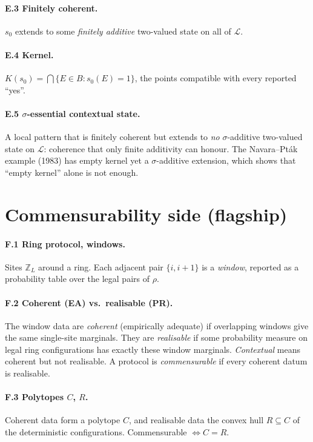 \documentclass[11pt]{article}
\theoremstyle{definition}
\theoremstyle{remark}
\newcommand{\bbZ}{\mathbb{Z}}
\begin{document}
\paragraph{E.3 Finitely coherent.} $s_0$ extends to some \emph{finitely
additive} two-valued state on all of $\mathcal L$.

\paragraph{E.4 Kernel.} $K(s_0)=\bigcap\{E\in B: s_0(E)=1\}$, the points
compatible with every reported ``yes''.

\paragraph{E.5 $\sigma$-essential contextual state.} A local pattern that is
finitely coherent but extends to \emph{no} $\sigma$-additive two-valued state on
$\mathcal L$: coherence that only finite additivity can honour. The
Navara--Pt\'ak example (1983) has empty kernel yet a $\sigma$-additive extension,
which shows that ``empty kernel'' alone is not enough.

\section{Commensurability side (flagship)}

\paragraph{F.1 Ring protocol, windows.} Sites $\bbZ_L$ around a ring. Each
adjacent pair $\{i,i+1\}$ is a \emph{window}, reported as a probability table over
the legal pairs of $\rho$.

\paragraph{F.2 Coherent (EA) vs.\ realisable (PR).} The window data are
\emph{coherent} (empirically adequate) if overlapping windows give the same
single-site marginals. They are \emph{realisable} if some probability measure on
legal ring configurations has exactly these window marginals. \emph{Contextual}
means coherent but not realisable. A protocol is \emph{commensurable} if every
coherent datum is realisable.

\paragraph{F.3 Polytopes $C$, $R$.} Coherent data form a polytope $C$, and
realisable data the convex hull $R\subseteq C$ of the deterministic
configurations. Commensurable $\iff C=R$.
\end{document}
